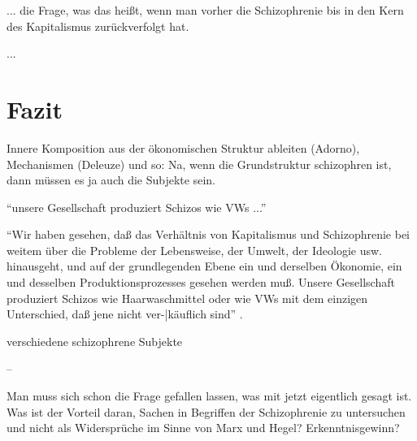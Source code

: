 \documentclass[12pt,
               DIV13,
               paper=a4,
               twoside=false,
               onehalfspacing,
               bibliography=totoc,
               toc=graduated,
               draft,
               ]{scrartcl}
\newcommand{\pc}[2]{\parencite[#1]{#2}}
\begin{document}
... die Frage, was das heißt, wenn man vorher die Schizophrenie bis in
den Kern des Kapitalismus zurückverfolgt hat.

...



\section{Fazit}

Innere Komposition aus der ökonomischen Struktur ableiten (Adorno),
Mechanismen (Deleuze) und so: Na, wenn die Grundstruktur schizophren
ist, dann müssen es ja auch die Subjekte sein.

"`unsere Gesellschaft produziert Schizos wie VWs ..."'

"`Wir haben gesehen, daß das Verhältnis von
Kapitalismus und Schizophrenie bei weitem über die Probleme der
Lebensweise, der Umwelt, der Ideologie usw. hinausgeht, und auf der
grundlegenden Ebene ein und derselben Ökonomie, ein und desselben
Produktionsprozesses gesehen werden muß. Unsere Gesellschaft
produziert Schizos wie Haarwaschmittel oder wie VWs mit dem einzigen
Unterschied, daß jene nicht ver-|käuflich sind"' \pc{S. 315 f.}{ao}.

verschiedene schizophrene Subjekte

--

Man muss sich schon die Frage gefallen lassen, was mit jetzt
eigentlich gesagt ist. Was ist der Vorteil daran, Sachen in Begriffen der
Schizophrenie zu untersuchen und nicht als Widersprüche im Sinne von
Marx und Hegel? Erkenntnisgewinn?


\newpage
\printshorthands
\printbibliography
\end{document}
